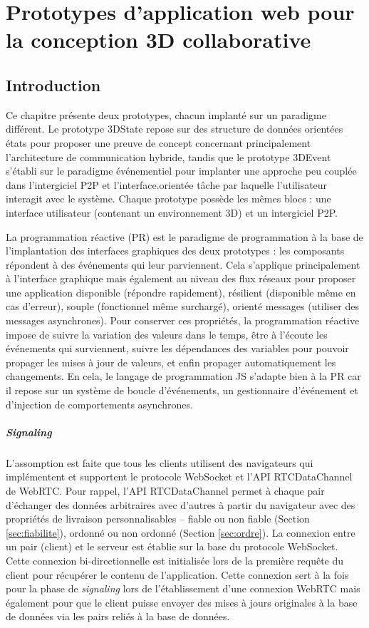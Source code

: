 \chapter{Prototypes d'application web pour la conception 3D collaborative}
\chaptertable

\section{Introduction}
Ce chapitre présente deux prototypes, chacun implanté sur un paradigme différent.
Le prototype 3DState repose sur des structure de données orientées états pour 
proposer une preuve de concept concernant principalement l'architecture de 
communication hybride, tandis que le prototype 3DEvent s'établi sur le paradigme 
événementiel pour implanter une approche peu couplée dans l'intergiciel \gls{P2P} 
et l'interface.orientée tâche par laquelle l'utilisateur interagit avec le système.
Chaque prototype possède les mêmes blocs : une interface utilisateur (contenant 
un environnement 3D) et un intergiciel \gls{P2P}.


La programmation réactive (PR) est le paradigme de programmation à la base de 
l'implantation des interfaces graphiques des deux prototypes : les composants 
répondent à des événements qui leur parviennent. 
Cela s'applique principalement à l'interface graphique mais 
également au niveau des flux réseaux pour proposer une application disponible 
(répondre rapidement), résilient (disponible même en cas d'erreur), souple 
(fonctionnel même surchargé), orienté messages (utiliser des messages 
asynchrones). Pour conserver ces propriétés, la programmation réactive impose 
de suivre la variation des valeurs dans le temps, être à l'écoute les événements 
qui surviennent, suivre les dépendances des variables pour pouvoir propager les 
mises à jour de valeurs, et enfin propager automatiquement les changements.
En cela, le langage de programmation \gls{JS} s'adapte bien à la PR car il repose 
sur un système de boucle d'événements, un gestionnaire d'événement et 
d'injection de comportements asynchrones. 

\paragraph{Signaling}
L'assomption est faite que tous les clients utilisent des navigateurs qui 
implémentent et supportent le protocole WebSocket et l'\gls{API} 
RTCDataChannel de WebRTC. Pour rappel, l'\gls{API} RTCDataChannel permet à 
chaque pair d'échanger des données arbitraires 
avec d'autres à partir du navigateur avec des propriétés de livraison 
personnalisables -- fiable ou non fiable (Section \ref{sec:fiabilite}), ordonné ou non 
ordonné (Section \ref{sec:ordre}). 
La connexion entre un pair (client) et le serveur est établie sur la base du protocole 
\gls{WebSocket}. Cette connexion bi-directionnelle est initialisée lors de la 
première requête du client pour récupérer le contenu de l'application. Cette 
connexion sert à la fois pour la phase de \textit{signaling} lors de l'établissement 
d'une connexion \gls{WebRTC} mais également pour que le client puisse envoyer 
des mises à jours originales à la base de données via les pairs reliés à la base de 
données. 


